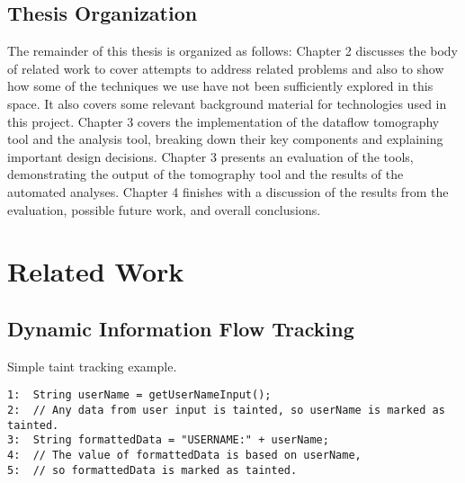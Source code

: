 \documentclass[msc,oneside]{ubcthesis}
\begin{document}
\section{Thesis Organization}
	
The remainder of this thesis is organized as follows: Chapter 2 discusses the body of related work to cover attempts to address related problems and also to show how some of the techniques we use have not been sufficiently explored in this space. It also covers some relevant background material for technologies used in this project. Chapter 3 covers the implementation of the dataflow tomography tool and the analysis tool, breaking down their key components and explaining important design decisions. Chapter 3 presents an evaluation of the tools, demonstrating the output of the tomography tool and the results of the automated analyses. Chapter 4 finishes with a discussion of the results from the evaluation, possible future work, and overall conclusions.
	
\chapter{Related Work}

\section{Dynamic Information Flow Tracking}
	
\begin{Program}
  \caption{\label{prog:code1} Simple taint tracking example.}
\begin{verbatim}
1:	String userName = getUserNameInput(); 
2:	// Any data from user input is tainted, so userName is marked as tainted.
3:	String formattedData = "USERNAME:" + userName; 
4:	// The value of formattedData is based on userName, 
5:	// so formattedData is marked as tainted.
\end{verbatim}
\end{Program}	
	
\end{document}
